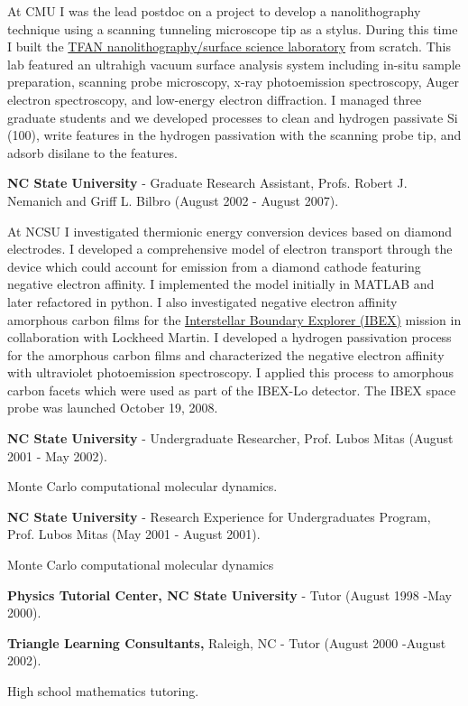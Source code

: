 At CMU I was the lead postdoc on a project to develop a nanolithography
technique using a scanning tunneling microscope tip as a stylus. During
this time I built the \href{https://www.flickr.com/groups/tfan/}{TFAN
nanolithography/surface science laboratory} from scratch. This lab
featured an ultrahigh vacuum surface analysis system including in-situ
sample preparation, scanning probe microscopy, x-ray photoemission
spectroscopy, Auger electron spectroscopy, and low-energy electron
diffraction. I managed three graduate students and we developed
processes to clean and hydrogen passivate Si (100), write features in
the hydrogen passivation with the scanning probe tip, and adsorb
disilane to the features.

\textbf{NC State University} - Graduate Research Assistant, Profs.
Robert J. Nemanich and Griff L. Bilbro (August 2002 - August 2007).

At NCSU I investigated thermionic energy conversion devices based on
diamond electrodes. I developed a comprehensive model of electron
transport through the device which could account for emission from a
diamond cathode featuring negative electron affinity. I implemented the
model initially in MATLAB and later refactored in python. I also
investigated negative electron affinity amorphous carbon films for the
\href{http://www.nasa.gov/mission_pages/ibex/index.html}{Interstellar
Boundary Explorer (IBEX)} mission in collaboration with Lockheed Martin.
I developed a hydrogen passivation process for the amorphous carbon
films and characterized the negative electron affinity with ultraviolet
photoemission spectroscopy. I applied this process to amorphous carbon
facets which were used as part of the IBEX-Lo detector. The IBEX space
probe was launched October 19, 2008.

\textbf{NC State University} - Undergraduate Researcher, Prof. Lubos
Mitas (August 2001 - May 2002).

Monte Carlo computational molecular dynamics.

\textbf{NC State University} - Research Experience for Undergraduates
Program, Prof. Lubos Mitas (May 2001 - August 2001).

Monte Carlo computational molecular dynamics

\textbf{Physics Tutorial Center, NC State University} - Tutor (August
1998 -May 2000).

\textbf{Triangle Learning Consultants,} Raleigh, NC - Tutor (August 2000
-August 2002).

High school mathematics tutoring.

